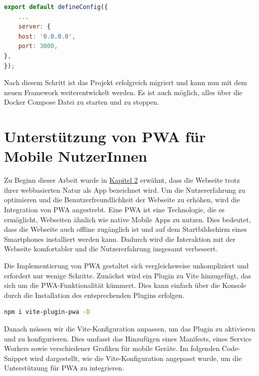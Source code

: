 \begin{lstlisting}[language={JavaScript}, caption={Port Konfiguration für das Vue Projekt}]
export default defineConfig({
    ...
    server: {
    host: '0.0.0.0',
    port: 3000,
},
});
\end{lstlisting}

Nach diesem Schritt ist das Projekt erfolgreich migriert und kann nun mit dem neuen Framework weiterentwickelt werden. Es ist auch möglich, alles über die Docker Compose Datei zu starten und zu stoppen.

\section{Unterstützung von PWA für Mobile NutzerInnen}

Zu Beginn dieser Arbeit wurde in \hyperref[chapter:2]{Kapitel 2} erwähnt, dass die Webseite trotz ihrer webbasierten Natur als App bezeichnet wird. Um die Nutzererfahrung zu optimieren und die Benutzerfreundlichkeit der Webseite zu erhöhen, wird die Integration von \acf{PWA} angestrebt. Eine \acs{PWA} ist eine Technologie, die es ermöglicht, Webseiten ähnlich wie native Mobile Apps zu nutzen. Dies bedeutet, dass die Webseite auch offline zugänglich ist und auf dem Startbildschirm eines Smartphones installiert werden kann. Dadurch wird die Interaktion mit der Webseite komfortabler und die Nutzererfahrung insgesamt verbessert. \cite{ms-pwa}

Die Implementierung von \acs{PWA} gestaltet sich vergleichsweise unkompliziert und erfordert nur wenige Schritte. Zunächst wird ein Plugin zu Vite hinzugefügt, das sich um die \acs{PWA}-Funktionalität kümmert. Dies kann einfach über die Konsole durch die Installation des entsprechenden Plugins erfolgen.

\begin{lstlisting}[language={bash}, caption={Installation des PWA Plugins}]
npm i vite-plugin-pwa -D 
\end{lstlisting}

Danach müssen wir die Vite-Konfiguration anpassen, um das Plugin zu aktivieren und zu konfigurieren. Dies umfasst das Hinzufügen eines Manifests, eines Service Workers sowie verschiedener Grafiken für mobile Geräte. Im folgenden Code-Snippet wird dargestellt, wie die Vite-Konfiguration angepasst wurde, um die Unterstützung für \acs{PWA} zu integrieren.

